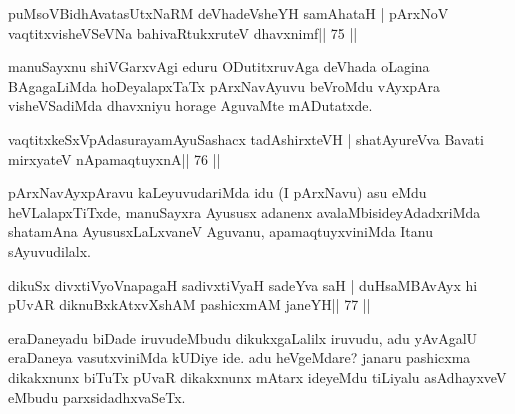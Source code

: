 
\begin{shl}
puMsoV\s BidhAvatasUtxNaRM deVhadeVsheYH samAhataH |
pArxNoV vaqtitxvisheVSeVNa bahivaRtukxruteV dhavxnimf\hfill || 75 ||
\end{shl}

\begin{artha}
manuSayxnu shiVGarxvAgi eduru ODutitxruvAga deVhada oLagina BAgagaLiMda hoDeyalapxTaTx pArxNavAyuvu beVroMdu vAyxpAra visheVSadiMda dhavxniyu horage AguvaMte mADutatxde.
\end{artha} 
 

\begin{shl}
\footnotemark[9]vaqtitxkeSxVpAdasurayamAyuSashacx tadAshirxteVH |
shatAyureVva Bavati mirxyateV nApamaqtuyxnA\hfill || 76 ||
\end{shl}

\begin{artha}
pArxNavAyxpAravu kaLeyuvudariMda idu (I pArxNavu) asu eMdu heVLalapxTiTxde, manuSayxra Ayususx adanenx avalaMbisideyAdadxriMda shatamAna AyususxLaLxvaneV Aguvanu, apamaqtuyxviniMda Itanu sAyuvudilalx.
\end{artha}


\begin{shl}
dikuSx divxtiVyoV\s napagaH sadivxtiVyaH sadeYva saH |
duHsaMBAvAyx hi pUvAR diknuBxkAtxvX\s\s shAM pashicxmAM janeYH\hfill || 77 ||
\end{shl}

\begin{artha}
eraDaneyadu biDade iruvudeMbudu dikukxgaLalilx iruvudu, adu yAvAgalU eraDaneya vasutxviniMda kUDiye ide. adu heVgeMdare? janaru pashicxma dikakxnunx biTuTx pUvaR dikakxnunx mAtarx ideyeMdu tiLiyalu asAdhayxveV eMbudu parxsidadhxvaSeTx.
\end{artha}


